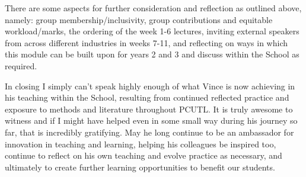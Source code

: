 \documentclass[a4paper,12pt]{article}
\begin{document}
There are some aspects for further consideration and reflection as outlined above, namely: group membership/inclusivity, group contributions and equitable workload/marks, the ordering of the week 1-6 lectures, inviting external speakers from across different industries in weeks 7-11, and reflecting on ways in which this module can be built upon for years 2 and 3 and discuss within the School as required.

In closing I simply can't speak highly enough of what Vince is now achieving in his teaching within the School, resulting from continued reflected practice and exposure to methods and literature throughout PCUTL. It is truly awesome to witness and if I might have helped even in some small way during his journey so far, that is incredibly gratifying.  May he long continue to be an ambassador for innovation in teaching and learning, helping his colleagues be inspired too, continue to reflect on his own teaching and evolve practice as necessary, and ultimately to create further learning opportunities to benefit our students.
\end{document}
